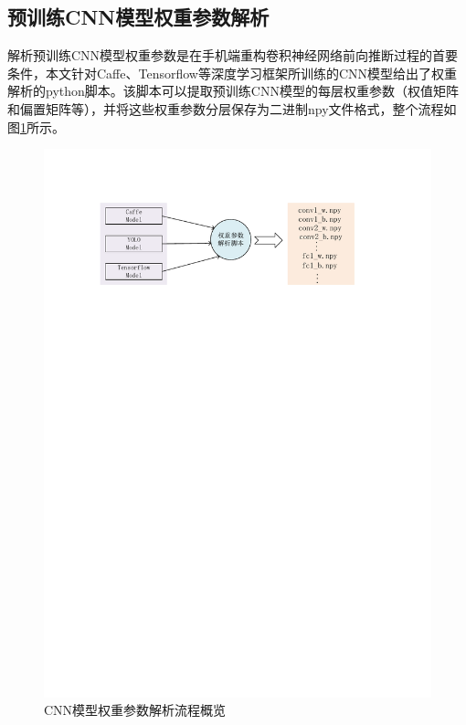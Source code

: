 \subsection{预训练CNN模型权重参数解析}
\label{chapter:chapter3-2-1}
解析预训练CNN模型权重参数是在手机端重构卷积神经网络前向推断过程的首要条件，本文针对Caffe、Tensorflow等深度学习框架所训练的CNN模型给出了权重解析的python脚本。该脚本可以提取预训练CNN模型的每层权重参数（权值矩阵和偏置矩阵等），并将这些权重参数分层保存为二进制npy文件格式，整个流程如图\ref{figure:figure14}所示。

\begin{figure}[htbp]
    \begin{center}
    \includegraphics{figures/weight.pdf}
    \end{center}
    \caption{CNN模型权重参数解析流程概览}\label{figure:figure14}
\end{figure}

